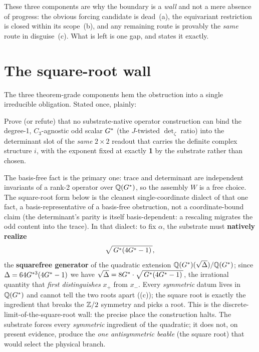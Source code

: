 \medskip
\noindent These three components are why the boundary is a \emph{wall} and not a
mere absence of progress: the obvious forcing candidate is dead~(a), the
equivariant restriction is closed within its scope~(b), and any remaining route is
provably the \emph{same} route in disguise~(c). What is left is one gap, and
 states it exactly.

\section{The square-root wall}\label{sec:kbind}
The three theorem-grade components hem the obstruction into a single irreducible
obligation. Stated once, plainly:

\begin{boundarybox}
Prove (or refute) that no substrate-native operator construction can
bind the degree-1, $C_3$-agnostic odd scalar $G^{*}$ (the $J$-twisted $\det_\zeta$
ratio) into the determinant slot of the \emph{same} $2\times2$ readout that
carries the definite complex structure $i$, with the exponent fixed at exactly
\textbf{1} by the substrate rather than chosen.
\end{boundarybox}

\noindent The basis-free fact is the primary one: trace and determinant are
independent invariants of a rank-2 operator over $\mathbb{Q}(G^{*})$, so the assembly $W$ is
a free choice. The square-root form below is the cleanest single-coordinate
dialect of that one fact, a basis-representative of a basis-free obstruction,
not a coordinate-bound claim (the determinant's parity is itself basis-dependent:
a rescaling migrates the odd content into the trace). In that dialect: to fix
$\alpha$, the substrate must \textbf{natively realize}
\[ \sqrt{\,G^{*}(4G^{*} - 1)\,}, \]
the \textbf{squarefree generator} of the quadratic extension
$\mathbb{Q}(G^{*})(\sqrt\Delta)/\mathbb{Q}(G^{*})$; since $\Delta=64G^{*3}(4G^{*}-1)$ we have
$\sqrt\Delta=8G^{*}\cdot\sqrt{\,G^{*}(4G^{*} - 1)\,}$, the irrational quantity that \emph{first
distinguishes} $x_+$ from $x_-$. Every \emph{symmetric} datum lives in $\mathbb{Q}(G^{*})$
and cannot tell the two roots apart ((c)); the square root is
exactly the ingredient that breaks the $\mathbb{Z}/2$ symmetry and picks a root. This is
the discrete-limit-of-the-square-root wall: the precise place the construction
halts. The substrate forces every \emph{symmetric} ingredient of the quadratic;
it does not, on present evidence, produce the \emph{one antisymmetric
beable} (the square root) that would select the physical branch.

